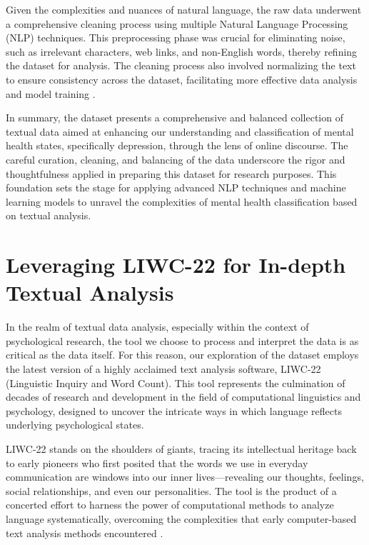 Given the complexities and nuances of natural language, the raw data underwent a comprehensive cleaning process using multiple Natural Language Processing (NLP) techniques. This preprocessing phase was crucial for eliminating noise, such as irrelevant characters, web links, and non-English words, thereby refining the dataset for analysis. The cleaning process also involved normalizing the text to ensure consistency across the dataset, facilitating more effective data analysis and model training \cite{depressionDataset}.

In summary, the dataset presents a comprehensive and balanced collection of textual data aimed at enhancing our understanding and classification of mental health states, specifically depression, through the lens of online discourse. The careful curation, cleaning, and balancing of the data underscore the rigor and thoughtfulness applied in preparing this dataset for research purposes. This foundation sets the stage for applying advanced NLP techniques and machine learning models to unravel the complexities of mental health classification based on textual analysis.

\section{Leveraging LIWC-22 for In-depth Textual Analysis}

\quad In the realm of textual data analysis, especially within the context of psychological research, the tool we choose to process and interpret the data is as critical as the data itself. For this reason, our exploration of the dataset employs the latest version of a highly acclaimed text analysis software, LIWC-22 (Linguistic Inquiry and Word Count). This tool represents the culmination of decades of research and development in the field of computational linguistics and psychology, designed to uncover the intricate ways in which language reflects underlying psychological states.

LIWC-22 stands on the shoulders of giants, tracing its intellectual heritage back to early pioneers who first posited that the words we use in everyday communication are windows into our inner lives—revealing our thoughts, feelings, social relationships, and even our personalities. The tool is the product of a concerted effort to harness the power of computational methods to analyze language systematically, overcoming the complexities that early computer-based text analysis methods encountered \cite{boyd2022development}.

